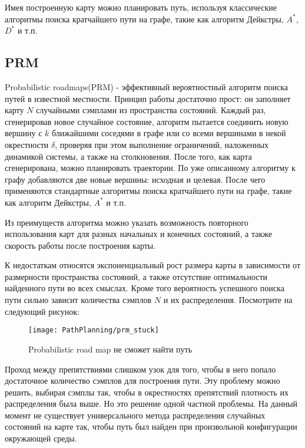 Имея построенную карту можно планировать путь, используя классические алгоритмы поиска кратчайшего пути на графе, такие как алгоритм Дейкстры, $A^{*}$, $D^{*}$ и т.п.

\subsection{PRM}\label{subsect1_2_2}
Probabilistic roadmaps(PRM) - эффективный вероятностный алгоритм поиска путей в известной местности. Принцип работы достаточно прост: он заполняет карту $N$ случайными сэмплами из пространства состояний. Каждый раз, сгенерировав новое случайное состояние, алгоритм пытается соединить новую вершину с $k$ ближайшими соседями в графе или со всеми вершинами в некой окрестности $\delta$, проверяя при этом выполнение ограничений, наложенных динамикой системы, а также на столкновения. После того, как карта сгенерирована, можно планировать траектории. По уже описанному алгоритму к графу добавляются две новые вершины: исходная и целевая. После чего применяются стандартные алгоритмы поиска кратчайшего пути на графе, такие как алгоритм Дейкстры\cite{CLRS}, $A^{*}$\cite{AStarWiki} и т.п.

Из преимуществ алгоритма можно указать возможность повторного использования карт для разных начальных и конечных состояний, а также скорость работы после построения карты.

К недостаткам относятся экспоненциальный рост размера карты в зависимости от размерности пространства состояний, а также отсутствие оптимальности найденного пути во всех смыслах. Кроме того вероятность успешного поиска пути сильно зависит количества сэмплов $N$ и их распределения. Посмотрите на следующий рисунок:

\begin{figure}[ht]
    \centering
    \texttt{[image: PathPlanning/prm\_stuck]}
    \caption{Probabilistic road map не сможет найти путь}
\end{figure}

Проход между препятствиями слишком узок для того, чтобы в него попало достаточное количество сэмплов для построения пути. Эту проблему можно решить, выбирая сэмплы так, чтобы в окрестностях препятствий плотность их распределения была выше. Но это решение одной частной проблемы. На данный момент не существует универсального метода распределения случайных состояний на карте так, чтобы путь был найден при произвольной конфигурации окружающей среды.\cite{CourseraMotionPlanning}

